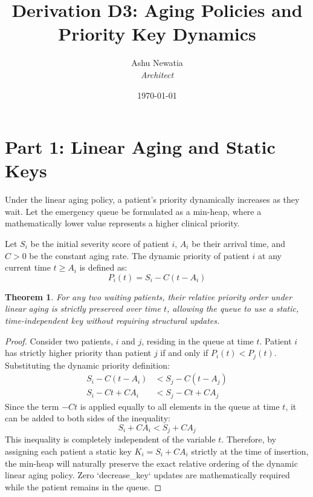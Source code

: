 \documentclass[12pt]{article}
\title{\textbf{Derivation D3: Aging Policies and Priority Key Dynamics}}
\author{Ashu Newatia \\ \textit{Architect}}
\date{\today}
\newtheorem{theorem}{Theorem}
\begin{document}
\maketitle

\section*{Part 1: Linear Aging and Static Keys}

Under the linear aging policy, a patient's priority dynamically increases as they wait. Let the emergency queue be formulated as a min-heap, where a mathematically lower value represents a higher clinical priority. 

Let $S_i$ be the initial severity score of patient $i$, $A_i$ be their arrival time, and $C > 0$ be the constant aging rate. The dynamic priority of patient $i$ at any current time $t \geq A_i$ is defined as:
\begin{equation}
    P_i(t) = S_i - C(t - A_i)
\end{equation}

\begin{theorem}
For any two waiting patients, their relative priority order under linear aging is strictly preserved over time $t$, allowing the queue to use a static, time-independent key without requiring structural updates.
\end{theorem}

\begin{proof}
Consider two patients, $i$ and $j$, residing in the queue at time $t$. Patient $i$ has strictly higher priority than patient $j$ if and only if $P_i(t) < P_j(t)$. Substituting the dynamic priority definition:
\begin{align*}
    S_i - C(t - A_i) &< S_j - C(t - A_j) \\
    S_i - Ct + C A_i &< S_j - Ct + C A_j
\end{align*}
Since the term $-Ct$ is applied equally to all elements in the queue at time $t$, it can be added to both sides of the inequality:
\begin{equation}
    S_i + C A_i < S_j + C A_j
\end{equation}
This inequality is completely independent of the variable $t$. Therefore, by assigning each patient a static key $K_i = S_i + C A_i$ strictly at the time of insertion, the min-heap will naturally preserve the exact relative ordering of the dynamic linear aging policy. Zero `decrease_key` updates are mathematically required while the patient remains in the queue.
\end{proof}
\end{document}
